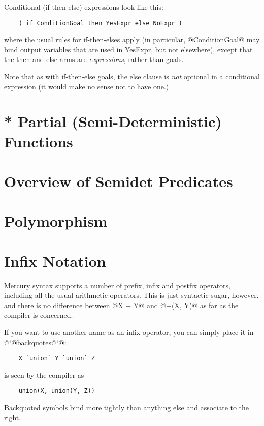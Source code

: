 Conditional (if-then-else) expressions look like this:
\begin{verbatim}
    ( if ConditionGoal then YesExpr else NoExpr )
\end{verbatim}
where the usual rules for if-then-elses apply (in particular,
@ConditionGoal@ may bind output variables that are used in
YesExpr, but not elsewhere), except that the then and else
arms are \emph{expressions}, rather than goals.

Note that as with if-then-else goals, the else clause is \emph{not}
optional in a conditional expression (it would make no sense
not to have one.)

\section{* Partial (Semi-Deterministic) Functions}


\section{Overview of Semidet Predicates}


\section{Polymorphism}


\section{Infix Notation}

Mercury syntax supports a number of prefix, infix and postfix
operators, including all the usual arithmetic operators.  This
is just syntactic sugar, however, and there is no difference
between @X + Y@ and @+(X, Y)@ as far as the compiler is concerned.

If you want to use another name as an infix operator, you can
simply place it in @`@backquotes@`@:
\begin{verbatim}
    X `union` Y `union` Z
\end{verbatim}
is seen by the compiler as
\begin{verbatim}
    union(X, union(Y, Z))
\end{verbatim}
Backquoted symbols bind more tightly than anything else and
associate to the right.



